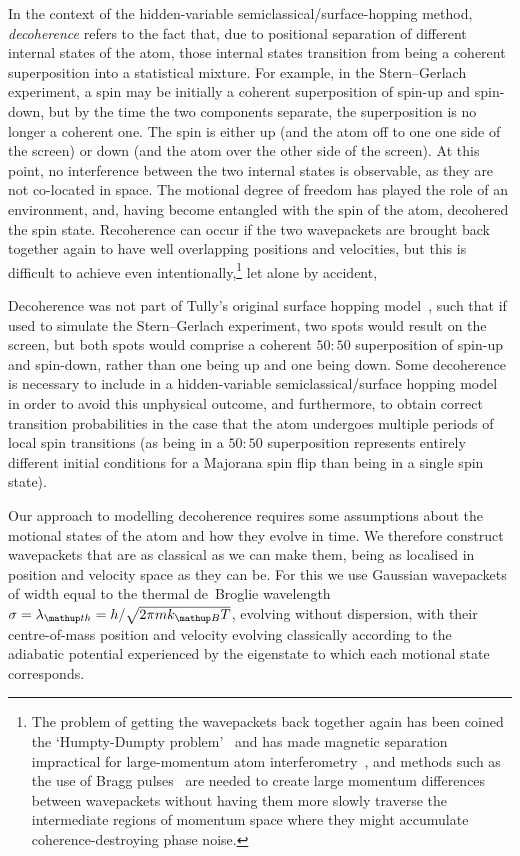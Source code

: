 In the context of the hidden-variable semiclassical/surface-hopping method, \emph{decoherence} refers to the fact that, due to positional separation of different internal states of the atom, those internal states transition from being a coherent superposition into a statistical mixture. For example, in the Stern--Gerlach experiment, a spin may be initially a coherent superposition of spin-up and spin-down, but by the time the two components separate, the superposition is no longer a coherent one. The spin is either up (and the atom off to one one side of the screen) or down (and the atom over the other side of the screen). At this point, no interference between the two internal states is observable, as they are not co-located in space. The motional degree of freedom has played the role of an environment, and, having become entangled with the spin of the atom, decohered the spin state. Recoherence can occur if the two wavepackets are brought back together again to have well overlapping positions and velocities, but this is difficult to achieve even intentionally,\footnote{The problem of getting the wavepackets back together again has been coined the `Humpty-Dumpty problem'~\cite{Schwinger1988, doi:10.1063/1.459170} and has made magnetic separation impractical for large-momentum atom interferometry~\cite{machluf_coherent_2013}, and methods such as the use of Bragg pulses~\cite{PhysRevLett.66.2693, PhysRevLett.75.2633} are needed to create large momentum differences between wavepackets without having them more slowly traverse the intermediate regions of momentum space where they might accumulate coherence-destroying phase noise.} let alone by accident, 

Decoherence was not part of Tully's original surface hopping model~\cite{doi:10.1063/1.459170}, such that if used to simulate the Stern--Gerlach experiment, two spots would result on the screen, but both spots would comprise a coherent $50:50$ superposition of spin-up and spin-down, rather than one being up and one being down. Some decoherence is necessary to include in a hidden-variable semiclassical/surface hopping model in order to avoid this unphysical outcome, and furthermore, to obtain correct transition probabilities in the case that the atom undergoes multiple periods of local spin transitions (as being in a $50:50$ superposition represents entirely different initial conditions for a Majorana spin flip than being in a single spin state).

Our approach to modelling decoherence requires some assumptions about the motional states of the atom and how they evolve in time. We therefore construct wavepackets that are as classical as we can make them, being as localised in position and velocity space as they can be. For this we use Gaussian wavepackets of width equal to the thermal de~Broglie wavelength $\sigma = \lambda_\up{th} = h/\sqrt{2\pi m k_\up{B} T}$, evolving without dispersion, with their centre-of-mass position and velocity evolving classically according to the adiabatic potential experienced by the eigenstate to which each motional state corresponds.

